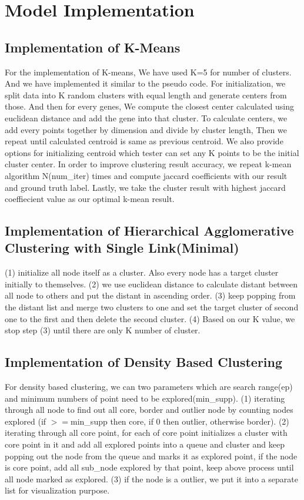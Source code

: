 \documentclass[fleqn]{llncs}
\begin{document}
\section{Model Implementation}
\subsection{Implementation of K-Means}
For the implementation of K-means, We have used K=5 for number of clusters. And we have implemented it similar to the pseudo code. For initialization, we split data into K random clusters with equal length and generate centers from those. And then for every genes, We compute the closest center calculated using euclidean distance and add the gene into that cluster. To calculate centers, we add every points together by dimension and divide by cluster length, Then we repeat until calculated centroid is same as previous centroid. We also provide options for initializing centroid which tester can set any K points to be the initial cluster center. In order to improve clustering result accuracy, we repeat k-mean algorithm N(num_iter) times and compute jaccard coefficients with our result and ground truth label. Lastly, we take the cluster result with highest jaccard coeffiecient value as our optimal k-mean result.


\subsection{Implementation of Hierarchical Agglomerative Clustering with Single Link(Minimal)}
(1) initialize all node itself as a cluster. Also every node has a target cluster initially to themselves. (2) we use euclidean distance to calculate distant between all node to others and put the distant in ascending order. (3) keep popping from the distant list and merge two clusters to one and set the target cluster of second one to the first and then delete the second cluster. (4) Based on our K value, we stop step (3) until there are only K number of cluster.

\subsection{Implementation of Density Based Clustering}
For density based clustering, we can two parameters which are search range(ep) and minimum numbers of point need to be explored(min\_supp). (1) iterating through all node to find out all core, border and outlier node by counting nodes explored (if ${>=}$min\_supp then core, if 0 then outlier, otherwise border). (2) iterating through all core point, for each of core point initializes a cluster with core point in it and add all explored points into a queue and cluster and keep popping out the node from the queue and marks it as explored point, if the node is core point, add all sub_node explored by that point, keep above process until all node marked as explored. (3) if the node is a outlier, we put it into a separate list for visualization purpose.
\end{document}
